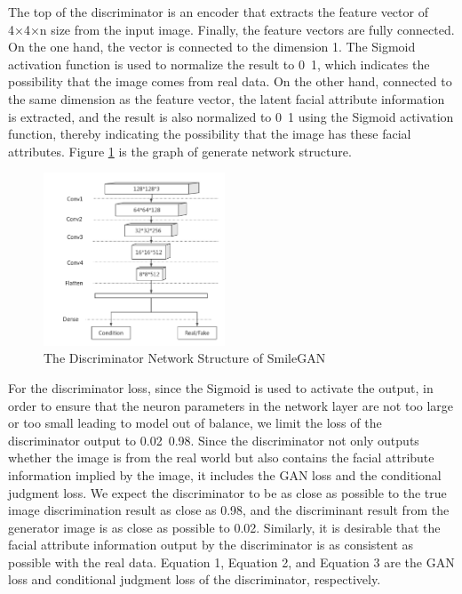 The top of the discriminator is an encoder that extracts the feature vector of 4×4×n size from the input image.
Finally, the feature vectors are fully connected.
On the one hand, the vector is connected to the dimension 1.
The Sigmoid activation function is used to normalize the result to 0~1,
    which indicates the possibility that the image comes from real data.
On the other hand, connected to the same dimension as the feature vector,
    the latent facial attribute information is extracted,
    and the result is also normalized to 0~1 using the Sigmoid activation function,
    thereby indicating the possibility that the image has these facial attributes.
Figure \ref{net_discriminator} is the graph of generate network structure.

\begin{figure}
    \begin{center}
    \includegraphics[width=0.48\textwidth]{figures/net_discriminator.png}
    \caption{The Discriminator Network Structure of SmileGAN}
    \label{net_discriminator}
    \end{center}
\end{figure}

For the discriminator loss, since the Sigmoid is used to activate the output,
    in order to ensure that the neuron parameters in the network layer are not too large or too small leading to model out of balance,
    we limit the loss of the discriminator output to 0.02~0.98.
Since the discriminator not only outputs whether the image is from the real world but also contains the facial attribute information implied by the image,
    it includes the GAN loss and the conditional judgment loss.
We expect the discriminator to be as close as possible to the true image discrimination result as close as 0.98,
    and the discriminant result from the generator image is as close as possible to 0.02.
Similarly, it is desirable that the facial attribute information output by the discriminator is as consistent as possible with the real data.
Equation 1, Equation 2, and Equation 3 are the GAN loss and conditional judgment loss of the discriminator, respectively.

